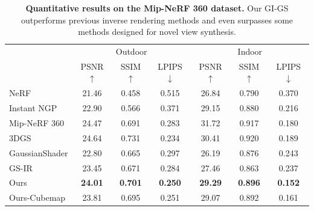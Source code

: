 \documentclass{article} %
\begin{document}
\begin{table}[t]
    \footnotesize
    \centering
    \renewcommand{\arraystretch}{1}
    \caption{\textbf{Quantitative results on the Mip-NeRF 360 dataset.} Our GI-GS outperforms previous inverse rendering methods and even surpasses some methods designed for novel view synthesis.}
    \label{tab:mip}
    \begin{tabular}{lccc|ccc}
         \hline & \multicolumn{3}{c}{Outdoor } & \multicolumn{3}{c}{    Indoor } \\
        & PSNR $\uparrow$ & SSIM $\uparrow$ & LPIPS $\downarrow$ & PSNR $\uparrow$ & SSIM $\uparrow$ & LPIPS $\downarrow$\\
        \hline NeRF & 21.46 & 0.458 &  0.515  & 26.84 &  0.790 &  0.370\\
        Instant NGP & 22.90 & 0.566 & 0.371 & 29.15 & 0.880 & 0.216\\
        Mip-NeRF 360 & \cellcolor{b}24.47 & 0.691 & 0.283 & \cellcolor{a}31.72 & \cellcolor{b}0.917 & \cellcolor{c}0.180\\
        3DGS & \cellcolor{a}24.64 & \cellcolor{a}0.731 & \cellcolor{a}0.234 & \cellcolor{b}30.41 & \cellcolor{a}0.920 & 0.189\\ \hline
        GaussianShader & 22.80 & 0.665 & 0.297 & 26.19 & 0.876 & 0.243\\
        GS-IR & 23.45 &  0.671 & 0.284 & 27.46 & 0.863 & 0.237\\
        \hline
        Ours & \cellcolor{c}\textbf{24.01} & \cellcolor{b}\textbf{0.701} & \cellcolor{b}\textbf{0.250} & \cellcolor{c}\textbf{29.29} & \cellcolor{c}\textbf{0.896} & \cellcolor{a}\textbf{0.152}\\
        Ours-Cubemap & 23.81 & \cellcolor{c}0.695 & \cellcolor{c}0.251 & 29.07 & 0.892 & \cellcolor{b}0.161\\
        \hline 
    \end{tabular}
    \vspace{-10pt}
\end{table}
\end{document}
